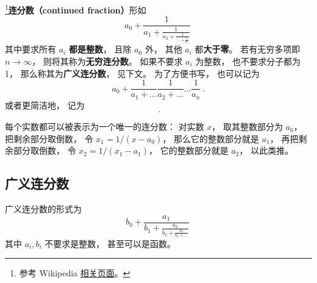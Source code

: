
\footnote{参考 Wikipedia \href{https://en.wikipedia.org/wiki/Continued_fraction}{相关页面}。}\textbf{连分数（continued fraction）}形如
\begin{equation}
a_0 + \frac{1}{\displaystyle a_1 + \frac{1}{\displaystyle a_2 + \frac{1}{\displaystyle \ddots + \frac{1}{a_n}}}}~
\end{equation}
其中要求所有 $a_i$ \textbf{都是整数}， 且除 $a_0$ 外， 其他 $a_i$ 都\textbf{大于零}。 若有无穷多项即 $n\to\infty$， 则将其称为\textbf{无穷连分数}。 如果不要求 $a_i$ 为整数， 也不要求分子都为 1， 那么称其为\textbf{广义连分数}， 见下文。 为了方便书写， 也可以记为
\begin{equation}
a_0 + \frac{1}{a_1 + \dots}\frac{1}{a_2 + \dots}\dots \frac{1}{a_n}~.
\end{equation}
或者更简洁地， 记为
\begin{equation}
[a_0;\ a_1,\ a_2,\ \dots\ ,\ a_n]~.
\end{equation}

每个实数都可以被表示为一个唯一的连分数： 对实数 $x$， 取其整数部分为 $a_0$， 把剩余部分取倒数， 令 $x_1 = 1/(x-a_0)$， 那么它的整数部分就是 $a_1$， 再把剩余部分取倒数， 令 $x_2 = 1/(x_1 - a_1)$， 它的整数部分就是 $a_2$， 以此类推。

\subsection{广义连分数}
广义连分数的形式为
\begin{equation}
b_0 + \frac{a_1}{\displaystyle b_1 + \frac{a_2}{\displaystyle b_2 + \frac{a_3}{\displaystyle b_3 + \dots}}}~
\end{equation}
其中 $a_i, b_i$ 不要求是整数， 甚至可以是函数。
